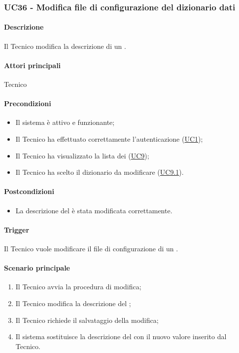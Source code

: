 \subsubsection{UC36 - Modifica file di configurazione del dizionario dati}\label{UC36}
\paragraph*{Descrizione}
Il Tecnico modifica la descrizione di un .

\paragraph*{Attori principali}
Tecnico

\paragraph*{Precondizioni}
\begin{itemize}
  \item Il sistema è attivo e funzionante;
  \item Il Tecnico ha effettuato correttamente l'autenticazione (\hyperref[UC1]{UC1});
  \item Il Tecnico ha visualizzato la lista dei  (\hyperref[UC9]{UC9});
  \item Il Tecnico ha scelto il dizionario da modificare (\hyperref[UC9.1]{UC9.1}).
\end{itemize}

\paragraph*{Postcondizioni}
\begin{itemize}
  \item La descrizione del  è stata modificata correttamente.
\end{itemize}

\paragraph*{Trigger}
Il Tecnico vuole modificare il file di configurazione di un .

\paragraph*{Scenario principale}
\begin{enumerate}
  \item Il Tecnico avvia la procedura di modifica;
  \item Il Tecnico modifica la descrizione del ;
  \item Il Tecnico richiede il salvataggio della modifica;
  \item Il sistema sostituisce la descrizione del  con il nuovo valore inserito dal Tecnico.
\end{enumerate}

